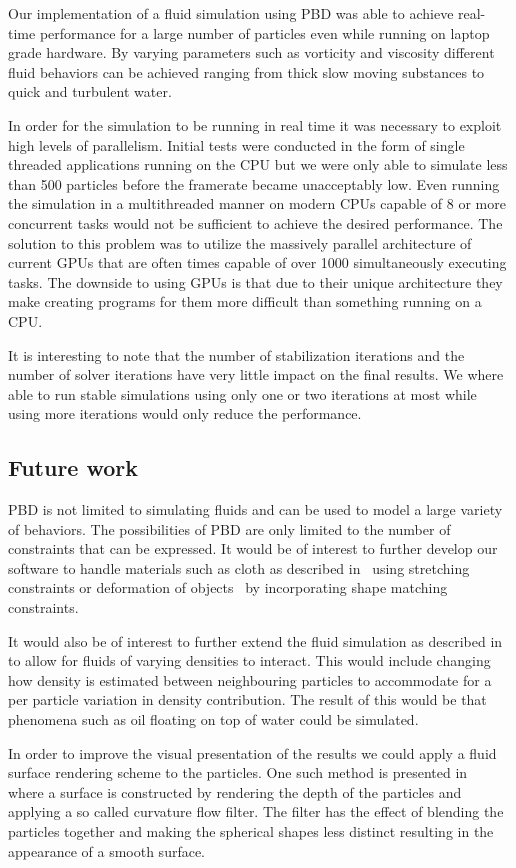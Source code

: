 Our implementation of a fluid simulation using PBD was able
to achieve real-time performance for a large number of particles even while
running on laptop grade hardware. By varying parameters such as vorticity and
viscosity different fluid behaviors can be achieved ranging from thick slow
moving substances to quick and turbulent water.

In order for the simulation to be running in real time it was necessary to
exploit high levels of parallelism. Initial tests were conducted in the form
of single threaded applications running on the CPU but we were only able to
simulate less than 500 particles before the framerate became unacceptably low.
Even running the simulation in a multithreaded manner on modern CPUs capable of
8 or more concurrent tasks would not be sufficient to achieve the desired
performance. The solution to this problem was to utilize the massively parallel
architecture of current GPUs that are often times
capable of over 1000 simultaneously executing tasks. The downside to using GPUs
is that due to their unique architecture they make creating programs for them
more difficult than something running on a CPU.

It is interesting to note that the number of stabilization iterations and the
number of solver iterations have very little impact on the final results. We
where able to run stable simulations using only one or two iterations at
most while using more iterations would only reduce the performance.

\subsection{Future work}
PBD is not limited to simulating
fluids and can be used to model a large variety of behaviors. The possibilities
of PBD are only limited to the number of constraints that
can be expressed. It would be of interest to further develop our software to
handle materials such as cloth as described in~\cite{muller2007position} using
stretching constraints or deformation of objects~\cite{muller2005meshless} by
incorporating shape matching constraints.

It would also be of interest to further extend the fluid simulation as
described in~\cite{macklin2014unified} to allow for fluids of varying densities
to interact. This would include changing how density is estimated between
neighbouring particles to accommodate for a per particle variation in density
contribution. The result of this would be that phenomena such as oil floating
on top of water could be simulated.

In order to improve the visual presentation of the results we could apply a
fluid surface rendering scheme to the particles. One such method is presented
in~\cite{van2009screen} where a surface is constructed by rendering the depth
of the particles and applying a so called curvature flow filter. The filter has
the effect of blending the particles together and making the spherical shapes
less distinct resulting in the appearance of a smooth surface.
